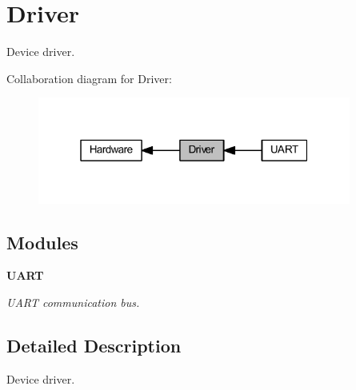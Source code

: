 \section{Driver}
\label{group___driver}


Device driver.  


Collaboration diagram for Driver\+:
\nopagebreak
\begin{figure}[H]
\begin{center}
\leavevmode
\includegraphics[width=292pt]{group___driver}
\end{center}
\end{figure}
\subsection*{Modules}
\begin{DoxyCompactItemize}
\item 
\textbf{ U\+A\+RT}
\begin{DoxyCompactList}\small\item\em U\+A\+RT communication bus. \end{DoxyCompactList}\end{DoxyCompactItemize}


\subsection{Detailed Description}
Device driver. 

